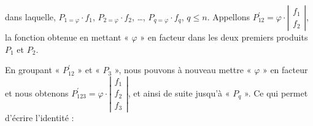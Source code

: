 dans laquelle, $P_{1=\varphi}\cdot f_{1}$, $P_{2=\varphi}\cdot f_{2}$,
\dots , $P_{q=\varphi}\cdot f_{q}$, $q\leq n$. Appellons $P_{12}^{'}=\varphi\cdot\left|\begin{array}{c}
f_{1}\\
f_{2}
\end{array}\right|$, la fonction obtenue en mettant «  $\varphi$  »{} en facteur
dans les deux premiers produits $P_{1}$ et $P_{2}$.

En groupant «   $P_{12}^{'}$  »{} et «  $P_{3}$  »{}, nous
pouvons à nouveau mettre «  $\varphi$  »{} en facteur et nous
obtenons $P_{123}^{'}=\varphi\cdot\left|\begin{array}{c}
f_{1}\\
f_{2}\\
f_{3}
\end{array}\right|$, et ainsi de suite jusqu'à «  $P_{q}$  »{}. Ce qui permet d'écrire
l'identité :

\begin{center}

\end{center}



